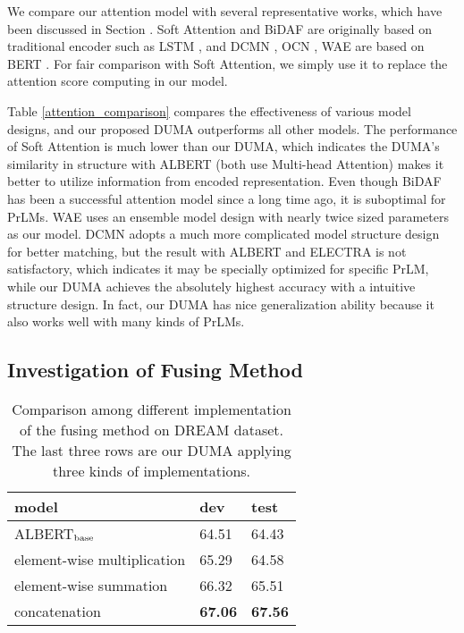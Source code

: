 \documentclass[letterpaper]{article} \usepackage{aaai21}  \usepackage{times}  \usepackage{helvet} \usepackage{courier}  \usepackage[hyphens]{url}  \usepackage{graphicx} \urlstyle{rm} \def\UrlFont{\rm}  \usepackage{natbib}  \usepackage{caption} \frenchspacing  \setlength{\pdfpagewidth}{8.5in}  \setlength{\pdfpageheight}{11in}
\begin{document}
We compare our attention model with several representative works, which have been discussed in Section \textit{}. Soft Attention \cite{nmt_attention} and BiDAF \cite{bidaf} are originally based on traditional encoder such as LSTM \cite{lstm}, and DCMN \cite{dcmn}, OCN \cite{ocn}, WAE\cite{bert_wae} are based on BERT \cite{bert}. For fair comparison with Soft Attention, we simply use it to replace the attention score computing in our model. 

Table \ref{attention_comparison} compares the effectiveness of various model designs, and our proposed DUMA outperforms all other models. The performance of Soft Attention is much lower than our DUMA, which indicates the DUMA's similarity in structure with ALBERT (both use Multi-head Attention) makes it better to utilize information from encoded representation. Even though BiDAF has been a successful attention model since a long time ago, it is suboptimal for PrLMs. WAE uses an ensemble model design with nearly twice sized parameters as our model. DCMN adopts a much more complicated model structure design for better matching, but the result with ALBERT and ELECTRA is not satisfactory, which indicates it may be specially optimized for specific PrLM, while our DUMA achieves the absolutely highest accuracy with a intuitive structure design. In fact, our DUMA has nice generalization ability because it also works well with many kinds of PrLMs.

\subsection{Investigation of Fusing Method} \label{fuse_investigate}

\begin{table}[t]\small
\renewcommand\arraystretch{1.3}
	\centering
	{
		\begin{tabular}{l|l|l}
			\hline		
			 model & dev & test  \\
			\hline
			\hline
			ALBERT$_{\rm base}$ & 64.51 & 64.43	 \\
			\hline
			element-wise multiplication & 65.29 &64.58\\
			element-wise summation & 66.32 & 65.51 \\
			concatenation & \textbf{67.06} & \textbf{67.56}\\
			\hline
		\end{tabular}
		
	}
	\caption{\label{fusing_methods} Comparison among different implementation of the fusing method on DREAM dataset. The last three rows are our DUMA applying three kinds of implementations.}
\end{table}
\end{document}
